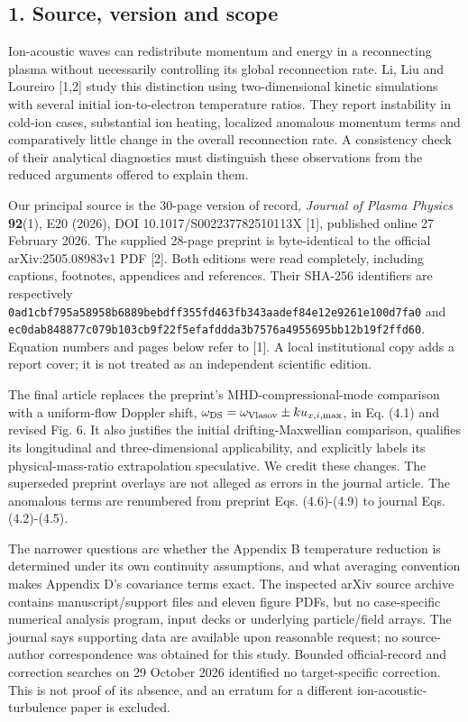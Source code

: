 \subsection{1. Source, version and
scope}\label{source-version-and-scope}

Ion-acoustic waves can redistribute momentum and energy in a
reconnecting plasma without necessarily controlling its global
reconnection rate. Li, Liu and Loureiro {[}1,2{]} study this distinction
using two-dimensional kinetic simulations with several initial
ion-to-electron temperature ratios. They report instability in cold-ion
cases, substantial ion heating, localized anomalous momentum terms and
comparatively little change in the overall reconnection rate. A
consistency check of their analytical diagnostics must distinguish these
observations from the reduced arguments offered to explain them.

Our principal source is the 30-page version of record, \emph{Journal of
Plasma Physics} \textbf{92}(1), E20 (2026), DOI
10.1017/S002237782510113X {[}1{]}, published online 27 February 2026.
The supplied 28-page preprint is byte-identical to the official
arXiv:2505.08983v1 PDF {[}2{]}. Both editions were read completely,
including captions, footnotes, appendices and references. Their SHA-256
identifiers are respectively
\nolinkurl{0ad1cbf795a58958b6889bebdff355fd463fb343aadef84e12e9261e100d7fa0}
and
\nolinkurl{ec0dab848877c079b103cb9f22f5efafddda3b7576a4955695bb12b19f2ffd60}.
Equation numbers and pages below refer to {[}1{]}. A local institutional
copy adds a report cover; it is not treated as an independent scientific
edition.

The final article replaces the preprint's MHD-compressional-mode
comparison with a uniform-flow Doppler shift,
\(\omega_{\rm DS}=\omega_{\rm Vlasov}\pm ku_{x,i,\max}\), in Eq. (4.1)
and revised Fig. 6. It also justifies the initial drifting-Maxwellian
comparison, qualifies its longitudinal and three-dimensional
applicability, and explicitly labels its physical-mass-ratio
extrapolation speculative. We credit these changes. The superseded
preprint overlays are not alleged as errors in the journal article. The
anomalous terms are renumbered from preprint Eqs. (4.6)-(4.9) to journal
Eqs. (4.2)-(4.5).

The narrower questions are whether the Appendix B temperature reduction
is determined under its own continuity assumptions, and what averaging
convention makes Appendix D's covariance terms exact. The inspected
arXiv source archive contains manuscript/support files and eleven figure
PDFs, but no case-specific numerical analysis program, input decks or
underlying particle/field arrays. The journal says supporting data are
available upon reasonable request; no source-author correspondence was
obtained for this study. Bounded official-record and correction searches
on 29 October 2026 identified no target-specific correction. This is not
proof of its absence, and an erratum for a different
ion-acoustic-turbulence paper is excluded.

